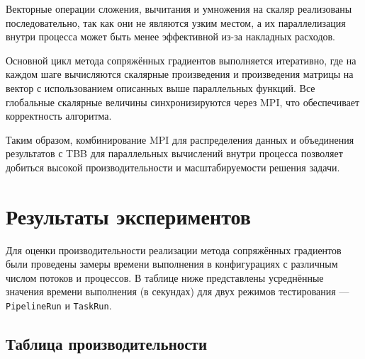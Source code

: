 \documentclass[12pt]{article}
\begin{document}
Векторные операции сложения, вычитания и умножения на скаляр реализованы последовательно, так как они не являются узким местом, а их параллелизация внутри процесса может быть менее эффективной из-за накладных расходов.

Основной цикл метода сопряжённых градиентов выполняется итеративно, где на каждом шаге вычисляются скалярные произведения и произведения матрицы на вектор с использованием описанных выше параллельных функций. Все глобальные скалярные величины синхронизируются через MPI, что обеспечивает корректность алгоритма.

Таким образом, комбинирование MPI для распределения данных и объединения результатов с TBB для параллельных вычислений внутри процесса позволяет добиться высокой производительности и масштабируемости решения задачи.
\section{Результаты экспериментов}

\hspace*{1.35em}Для оценки производительности реализации метода сопряжённых градиентов были проведены замеры времени выполнения в конфигурациях с различным числом потоков и процессов. В таблице ниже представлены усреднённые значения времени выполнения (в секундах) для двух режимов тестирования — \texttt{PipelineRun} и \texttt{TaskRun}.

\subsection{Таблица производительности}
\end{document}
